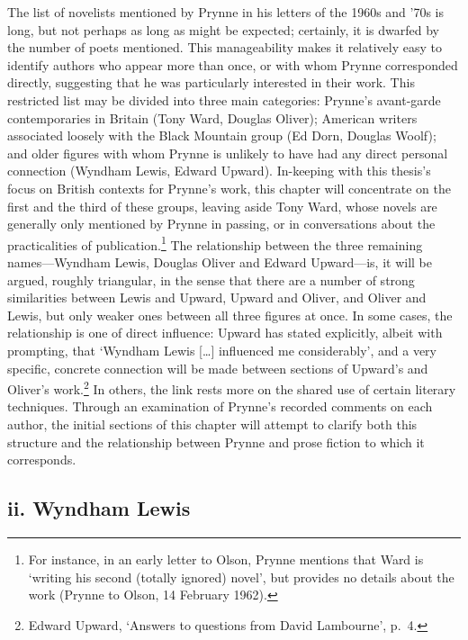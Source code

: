 \documentclass[]{article}
\begin{document}
The list of novelists mentioned by Prynne in his letters of the 1960s
and '70s is long, but not perhaps as long as might be expected;
certainly, it is dwarfed by the number of poets mentioned. This
manageability makes it relatively easy to identify authors who appear
more than once, or with whom Prynne corresponded directly, suggesting
that he was particularly interested in their work. This restricted list
may be divided into three main categories: Prynne's avant-garde
contemporaries in Britain (Tony Ward, Douglas Oliver); American writers
associated loosely with the Black Mountain group (Ed Dorn, Douglas
Woolf); and older figures with whom Prynne is unlikely to have had any
direct personal connection (Wyndham Lewis, Edward Upward). In-keeping
with this thesis's focus on British contexts for Prynne's work, this
chapter will concentrate on the first and the third of these groups,
leaving aside Tony Ward, whose novels are generally only mentioned by
Prynne in passing, or in conversations about the practicalities of
publication.\footnote{For instance, in an early letter to Olson, Prynne
  mentions that Ward is `writing his second (totally ignored) novel',
  but provides no details about the work (Prynne to Olson, 14 February
  1962).} The relationship between the three remaining names---Wyndham
Lewis, Douglas Oliver and Edward Upward---is, it will be argued, roughly
triangular, in the sense that there are a number of strong similarities
between Lewis and Upward, Upward and Oliver, and Oliver and Lewis, but
only weaker ones between all three figures at once. In some cases, the
relationship is one of direct influence: Upward has stated explicitly,
albeit with prompting, that `Wyndham Lewis {[}\ldots{}{]} influenced me
considerably', and a very specific, concrete connection will be made
between sections of Upward's and Oliver's work.\footnote{Edward Upward,
  `Answers to questions from David Lambourne', p.~4.} In others, the
link rests more on the shared use of certain literary techniques.
Through an examination of Prynne's recorded comments on each author, the
initial sections of this chapter will attempt to clarify both this
structure and the relationship between Prynne and prose fiction to which
it corresponds.

\subsection{ii. Wyndham Lewis}\label{ii.-wyndham-lewis}
\end{document}

